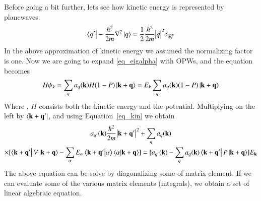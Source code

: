 Before going a bit further, lets see how kinetic energy is represented by planewaves.
\begin{equation}
\label{eq_kin}
	\bra{q'}-\frac{\hbar^2}{2m}\nabla^2\ket{q} = \frac{1}{2}\frac{\hbar^2}{2m} \abs{\vec{q}}^2 \delta_{\vec{q}\vec{q}'}
\end{equation}
In the above approximation of kinetic energy we assumed the normalizing factor is one.
Now we are going to expand \ref{eq_eigalpha} with OPWs, and the \schrod equation becomes
\begin{equation}
H\psi_k = \sum_q a_q (\vb{k})H(1-P)\ket{\vb{k}+\vb{q}}=E_k\sum_q a_q (\vb{k}) (1-P) \ket{\vb{k}+\vb{q}}
\end{equation}
Where , $H$ consists both the kinetic energy and the potential. Multiplying on the left by $\bra{\vb{k}+\vb{q}'}$, and using Equation~\eqref{eq_kin} we obtain
\begin{multline}
\label{eq_opwd}
a_{q'} (\vb{k}) \frac{\hbar^2}{2m}\abs{\vb{k}+\vb{q}'}^2 + \sum_q a_q (\vb{k}) \\
	\times
[\bra{\vb{k}+\vb{q}'}V\ket{\vb{k}+\vb{q}} - \sum_{\alpha} E_{\alpha} \braket{\vb{k}+\vb{q}'}{\alpha}\braket{\alpha}{\vb{k}+\vb{q}}]
	= [a_{q'} (\vb{k}) - \sum_q a_q (\vb{k}) \bra{\vb{k}+\vb{q}'}P\ket{\vb{k}+\vb{q}}]E_{\vb{k}}  
\end{multline}
The above equation can be solve by diagonalizing some of matrix element. If we can evaluate some of the various matrix elements (integrals), we obtain a set of linear algebraic equation.




%

